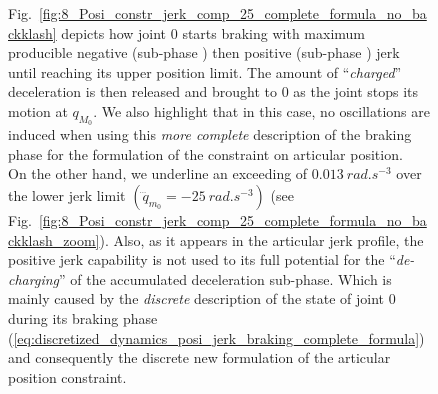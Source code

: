 \begin{figure}[!htbp]
Fig.~\ref{fig:8_Posi_constr_jerk_comp_25_complete_formula_no_backklash} depicts how joint $0$ starts braking with maximum producible negative (sub-phase ) then positive (sub-phase ) jerk until reaching its upper position limit. The amount of ``\textit{charged}'' deceleration is then released and brought to $0$ as the joint stops its motion at $q_{M_{0}}$. We also highlight that in this case, no oscillations are induced when using this \textit{more complete} description of the braking phase for the formulation of the constraint on articular position. \\ 
On the other hand, we underline an exceeding of $0.013~rad.s^{-3}$ over the lower jerk limit $(\dddot{q}_{m_{0}} = -25~rad.s^{-3})$ (see Fig.~\ref{fig:8_Posi_constr_jerk_comp_25_complete_formula_no_backklash_zoom}). Also, as it appears in the articular jerk profile, the positive jerk capability is not used to its full potential for the ``\textit{de-charging}'' of the accumulated deceleration sub-phase. Which is mainly caused by the \textit{discrete} description of the state of joint $0$ during its braking phase (\ref{eq:discretized_dynamics_posi_jerk_braking_complete_formula}) and consequently the discrete new formulation of the articular position constraint.
%
\begin{figure}[!htbp]

\end{figure}
\end{figure}

